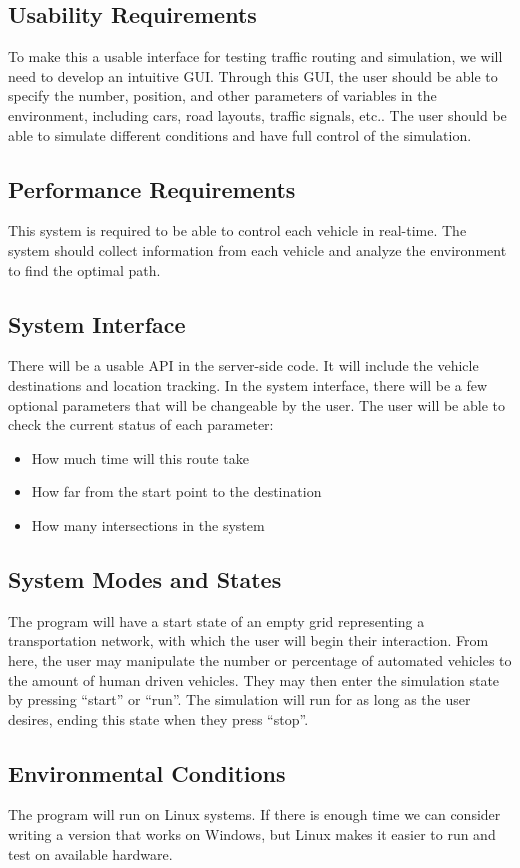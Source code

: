 \documentclass[10pt,letterpaper,draftclsnofoot,onecolumn]{IEEEtran}
\begin{document}
	\subsection{Usability Requirements}
	To make this a usable interface for testing traffic routing and simulation, we will need to develop an intuitive GUI. Through this GUI, the user should be able to specify the number, position, and other parameters of variables in the environment, including cars, road layouts, traffic signals, etc.. The user should be able to simulate different conditions and have full control of the simulation.
	\subsection{Performance Requirements}
	This system is required to be able to control each vehicle in real-time. The system should collect information from each vehicle and analyze the environment to find the optimal path.
	\subsection{System Interface}
	There will be a usable API in the server-side code. It will include the vehicle destinations and location tracking. In the system interface, there will be a few optional parameters that will be changeable by the user. The user will be able to check the current status of each parameter:
	\begin{itemize}
		\item How much time will this route take
		\item How far from the start point to the destination
		\item How many intersections in the system
	\end{itemize}
	\subsection{System Modes and States}
	The program will have a start state of an empty grid representing a transportation network, with which the user will begin their interaction. From here, the user may manipulate the number or percentage of automated vehicles to the amount of human driven vehicles. They may then enter the simulation state by pressing “start” or “run”. The simulation will run for as long as the user desires, ending this state when they press “stop”.
	\subsection{Environmental Conditions}
	The program will run on Linux systems. If there is enough time we can consider writing a version that works on Windows, but Linux makes it easier to run and test on available hardware.
\end{document}
